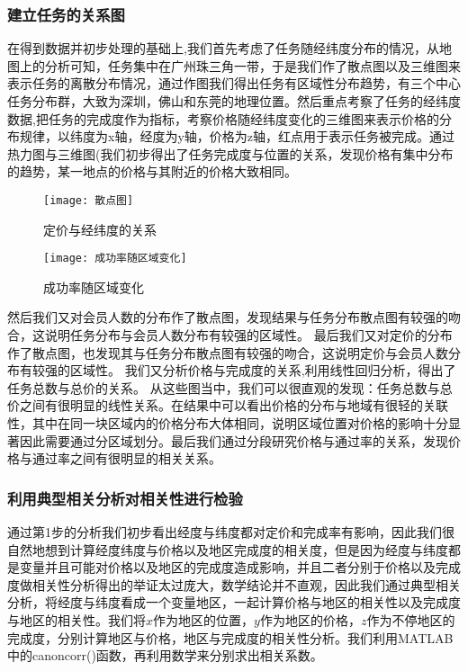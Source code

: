\documentclass{ctexart}
\begin{document}
\subsubsection{建立任务的关系图}
在得到数据并初步处理的基础上,我们首先考虑了任务随经纬度分布的情况，从地图上的分析可知，任务集中在广州珠三角一带，于是我们作了散点图以及三维图来表示任务的离散分布情况，通过作图我们得出任务有区域性分布趋势，有三个中心任务分布群，大致为深圳，佛山和东莞的地理位置。然后重点考察了任务的经纬度数据,把任务的完成度作为指标，考察价格随经纬度变化的三维图来表示价格的分布规律，以纬度为x轴，经度为y轴，价格为z轴，红点用于表示任务被完成。通过热力图与三维图(我们初步得出了任务完成度与位置的关系，发现价格有集中分布的趋势，某一地点的价格与其附近的价格大致相同。
\begin{figure}[htbp] 
\centering
\texttt{[image: 散点图]} 
\caption{定价与经纬度的关系}
\end{figure}
\begin{figure}[htbp] 
\centering
\texttt{[image: 成功率随区域变化]} 
\caption{成功率随区域变化}
\end{figure}
\newpage
然后我们又对会员人数的分布作了散点图，发现结果与任务分布散点图有较强的吻合，这说明任务分布与会员人数分布有较强的区域性。
最后我们又对定价的分布作了散点图，也发现其与任务分布散点图有较强的吻合，这说明定价与会员人数分布有较强的区域性。
我们又分析价格与完成度的关系,利用线性回归分析，得出了任务总数与总价的关系。
从这些图当中，我们可以很直观的发现：任务总数与总价之间有很明显的线性关系。在结果中可以看出价格的分布与地域有很轻的关联性，其中在同一块区域内的价格分布大体相同，说明区域位置对价格的影响十分显著因此需要通过分区域划分。最后我们通过分段研究价格与通过率的关系，发现价格与通过率之间有很明显的相关关系。

\subsubsection{利用典型相关分析对相关性进行检验}
通过第1步的分析我们初步看出经度与纬度都对定价和完成率有影响，因此我们很自然地想到计算经度纬度与价格以及地区完成度的相关度，但是因为经度与纬度都是变量并且可能对价格以及地区的完成度造成影响，并且二者分别于价格以及完成度做相关性分析得出的举证太过庞大，数学结论并不直观，因此我们通过典型相关分析，将经度与纬度看成一个变量地区，一起计算价格与地区的相关性以及完成度与地区的相关性。我们将$x$作为地区的位置，$y$作为地区的价格，$z$作为不停地区的完成度，分别计算地区与价格，地区与完成度的相关性分析。我们利用MATLAB中的canoncorr()函数，再利用数学来分别求出相关系数。
\end{document}
